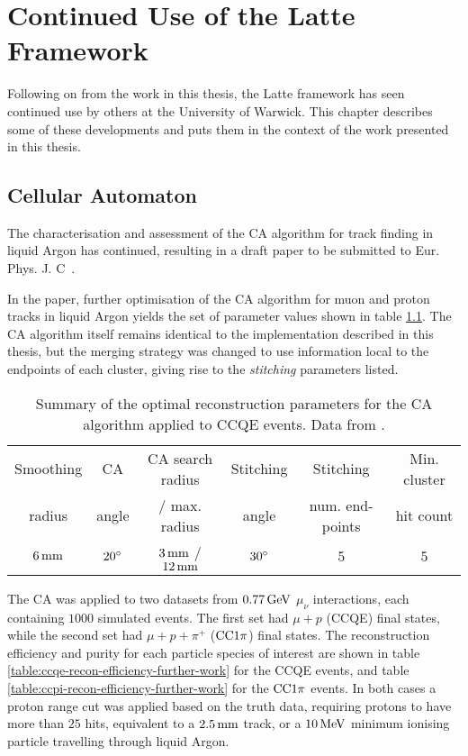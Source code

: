 \chapter{Continued Use of the Latte Framework}\label{appendix:other_uses}

Following on from the work in this thesis, the Latte framework has seen continued use by others at the University of Warwick. This chapter describes some of these developments and puts them in the context of the work presented in this thesis.

\section{Cellular Automaton}
The characterisation and assessment of the \ac{CA} algorithm for track finding in liquid Argon has continued, resulting in a draft paper to be submitted to Eur. Phys. J. C~\citep{Back2013}.

In the paper, further optimisation of the CA algorithm for muon and proton tracks in liquid Argon yields the set of parameter values shown in table \ref{table:opt-params-further-work}. The CA algorithm itself remains identical to the implementation described in this thesis, but the merging strategy was changed to use information local to the endpoints of each cluster, giving rise to the \emph{stitching} parameters listed.

\begin{table}
\centering
\begin{tabular}{*{6}{c}}
Smoothing & CA    & CA search radius & Stitching & Stitching       & Min. cluster \\
radius    & angle & / max. radius    & angle     & num. end-points & hit count \\
\hline
\hline
$6\,\mathrm{mm}$ & $20^\circ$ & $3\,\mathrm{mm}$ / $12\,\mathrm{mm}$ & $30^\circ$ & $5$ & $5$ \\
\hline
\end{tabular}
\caption[CA reconstruction parameters for CCQE events]{\label{table:opt-params-further-work}Summary of the optimal reconstruction parameters for the CA algorithm applied to CCQE events. Data from \cite{Back2013}.}
\end{table}

The CA was applied to two datasets from $0.77\,\mathrm{GeV}$ $\mu_\nu$ interactions, each containing $1000$ simulated events. The first set had $\mu + p$ (CCQE) final states, while the second set had $\mu + p + \pi^+$ ($\mathrm{CC}1\pi$) final states. The reconstruction efficiency and purity for each particle species of interest are shown in table \ref{table:ccqe-recon-efficiency-further-work} for the CCQE events, and table \ref{table:ccpi-recon-efficiency-further-work} for the $\mathrm{CC}1\pi$ events. In both cases a proton range cut was applied based on the truth data, requiring protons to have more than $25$ hits, equivalent to a $2.5\,\mathrm{mm}$ track, or a $10\,\mathrm{MeV}$ minimum ionising particle travelling through liquid Argon.

